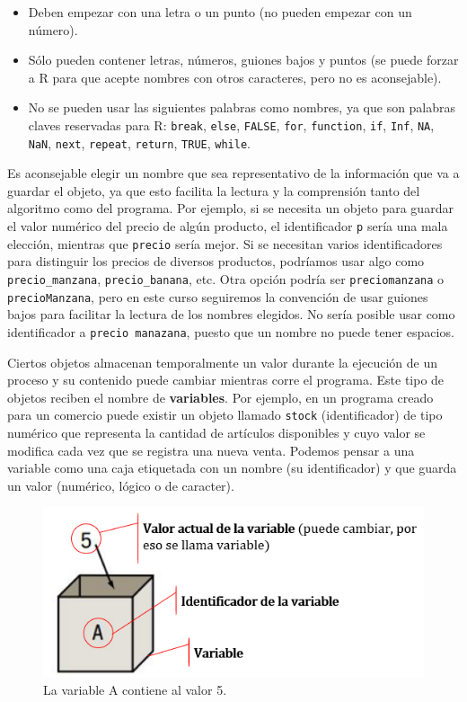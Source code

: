\documentclass[
]{book}
\providecommand{\tightlist}{%
  \setlength{\itemsep}{0pt}\setlength{\parskip}{0pt}}
\begin{document}
\begin{itemize}
\tightlist
\item
  Deben empezar con una letra o un punto (no pueden empezar con un número).
\item
  Sólo pueden contener letras, números, guiones bajos y puntos (se puede forzar a R para que acepte nombres con otros caracteres, pero no es aconsejable).
\item
  No se pueden usar las siguientes palabras como nombres, ya que son palabras claves reservadas para R: \texttt{break}, \texttt{else}, \texttt{FALSE}, \texttt{for}, \texttt{function}, \texttt{if}, \texttt{Inf}, \texttt{NA}, \texttt{NaN}, \texttt{next}, \texttt{repeat}, \texttt{return}, \texttt{TRUE}, \texttt{while}.
\end{itemize}

Es aconsejable elegir un nombre que sea representativo de la información que va a guardar el objeto, ya que esto facilita la lectura y la comprensión tanto del algoritmo como del programa. Por ejemplo, si se necesita un objeto para guardar el valor numérico del precio de algún producto, el identificador \texttt{p} sería una mala elección, mientras que \texttt{precio} sería mejor. Si se necesitan varios identificadores para distinguir los precios de diversos productos, podríamos usar algo como \texttt{precio\_manzana}, \texttt{precio\_banana}, etc. Otra opción podría ser \texttt{preciomanzana} o \texttt{precioManzana}, pero en este curso seguiremos la convención de usar guiones bajos para facilitar la lectura de los nombres elegidos. No sería posible usar como identificador a \texttt{precio\ manazana}, puesto que un nombre no puede tener espacios.

Ciertos objetos almacenan temporalmente un valor durante la ejecución de un proceso y su contenido puede cambiar mientras corre el programa. Este tipo de objetos reciben el nombre de \textbf{variables}. Por ejemplo, en un programa creado para un comercio puede existir un objeto llamado \texttt{stock} (identificador) de tipo numérico que representa la cantidad de artículos disponibles y cuyo valor se modifica cada vez que se registra una nueva venta. Podemos pensar a una variable como una caja etiquetada con un nombre (su identificador) y que guarda un valor (numérico, lógico o de caracter).

\begin{figure}

{\centering \includegraphics[width=0.5\linewidth]{images/02_obj/09_cajas2} 

}

\caption{La variable A contiene al valor 5.}\label{fig:cajas}
\end{figure}
\end{document}
